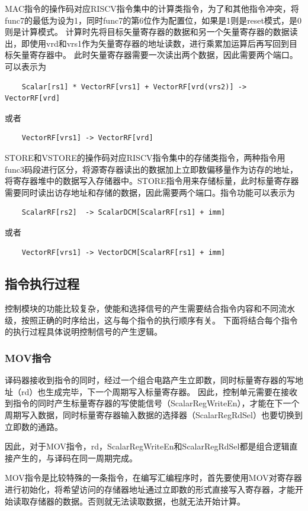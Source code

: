 \documentclass[UTF8]{ctexart}
\begin{document}
MAC指令的操作码对应RISCV指令集中的计算类指令，为了和其他指令冲突，将func7的最低为设为1，同时func7的第6位作为配置位，如果是1则是reset模式，是0则是计算模式。
计算时先将目标矢量寄存器的数据和另一个矢量寄存器的数据读出，即使用vrd和vrs1作为矢量寄存器的地址读数，进行乘累加运算后再写回到目标矢量寄存器中。
此时矢量寄存器需要一次读出两个数据，因此需要两个端口。
可以表示为
\begin{lstlisting}
    Scalar[rs1] * VectorRF[vrs1] + VectorRF[vrd(vrs2)] -> VectorRF[vrd]
\end{lstlisting} 
或者
\begin{lstlisting}
    VectorRF[vrs1] -> VectorRF[vrd]
\end{lstlisting}

STORE和VSTORE的操作码对应RISCV指令集中的存储类指令，两种指令用func3码段进行区分，将源寄存器读出的数据加上立即数偏移量作为访存的地址，
将寄存器堆中的数据写入存储器中。STORE指令用来存储标量，此时标量寄存器需要同时读出访存地址和存储的数据，因此需要两个端口。指令功能可以表示为
\begin{lstlisting}
    ScalarRF[rs2]  -> ScalarDCM[ScalarRF[rs1] + imm]
\end{lstlisting} 
或者
\begin{lstlisting}
    VectorRF[vrs1] -> VectorDCM[ScalarRF[rs1] + imm]
\end{lstlisting} 

\subsection{指令执行过程}
控制模块的功能比较复杂，使能和选择信号的产生需要结合指令内容和不同流水级，按照正确的时序给出，这与每个指令的执行顺序有关。
下面将结合每个指令的执行过程具体说明控制信号的产生逻辑。
\subsubsection{MOV指令}
译码器接收到指令的同时，经过一个组合电路产生立即数，同时标量寄存器的写地址（rd）也生成完毕，下一个周期写入标量寄存器。
因此，控制单元需要在接收到指令的同时产生标量寄存器的写使能信号（ScalarRegWriteEn），才能在下一个周期写入数据，同时标量寄存器输入数据的选择器（ScalarRegRdSel）也要切换到立即数的通路。

因此，对于MOV指令，rd，ScalarRegWriteEn和ScalarRegRdSel都是组合逻辑直接产生的，与译码在同一周期完成。

MOV指令是比较特殊的一条指令，在编写汇编程序时，首先要使用MOV对寄存器进行初始化，将希望访问的存储器地址通过立即数的形式直接写入寄存器，才能开始读取存储器的数据。否则就无法读取数据，也就无法开始计算。
\end{document}
